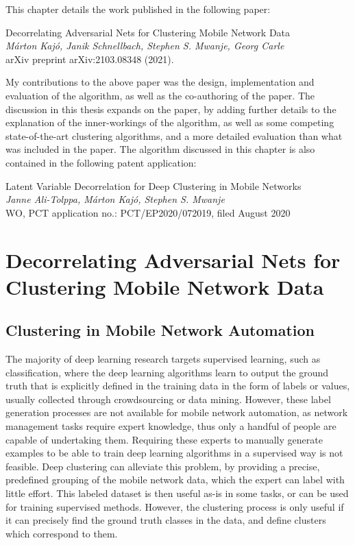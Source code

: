 	This chapter details the work published in the following paper:
	
	\begin{publication}
		Decorrelating Adversarial Nets for Clustering Mobile Network Data \\
		\textit{Márton Kajó, Janik Schnellbach, Stephen S. Mwanje, Georg Carle} \\
		arXiv preprint arXiv:2103.08348 (2021).
	\end{publication}

	My contributions to the above paper was the design, implementation and evaluation of the algorithm, as well as the co-authoring of the paper.
	The discussion in this thesis expands on the paper, by adding further details to the explanation of the inner-workings of the algorithm, as well as some competing state-of-the-art clustering algorithms, and a more detailed evaluation than what was included in the paper. 
	The algorithm discussed in this chapter is also contained in the following patent application:
	
	\begin{patent}
		Latent Variable Decorrelation for Deep Clustering in Mobile Networks \\
		\textit{Janne Ali-Tolppa, Márton Kajó, Stephen S. Mwanje} \\
		WO, PCT application no.: PCT/EP2020/072019, filed August 2020
	\end{patent}

	\section{Decorrelating Adversarial Nets for Clustering Mobile Network Data}
		\label{cha:decorr_ae:sec:decorr_ae}
		
		\subsection{Clustering in Mobile Network Automation}
			\label{cha:decorr_ae:sec:clust}
		
			The majority of deep learning research targets supervised learning, such as classification, where the deep learning algorithms learn to output the ground truth that is explicitly defined in the training data in the form of labels or values, usually collected through crowdsourcing or data mining.
			However, these label generation processes are not available for mobile network automation, as network management tasks require expert knowledge, thus only a handful of people are capable of undertaking them.
			Requiring these experts to manually generate examples to be able to train deep learning algorithms in a supervised way is not feasible.
			Deep clustering can alleviate this problem, by providing a precise, predefined grouping of the mobile network data, which the expert can label with little effort.
			This labeled dataset is then useful as-is in some tasks, or can be used for training supervised methods.
			However, the clustering process is only useful if it can precisely find the ground truth classes in the data, and define clusters which correspond to them.
			
